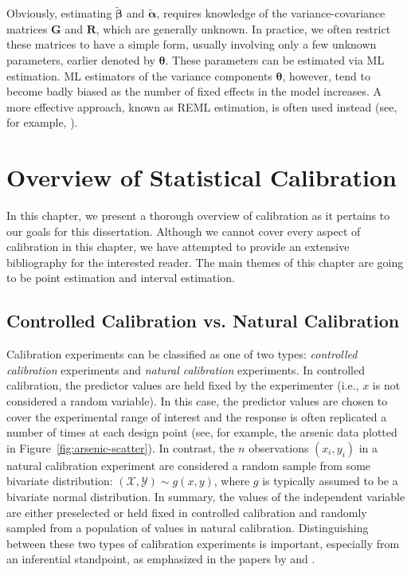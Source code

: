 \documentclass[cmfont,usenames,dvipsnames,leqno]{afit-etd}\usepackage[]{graphicx}\usepackage[]{color}
\newcommand{\mc}[1]{\ensuremath{\mathcal{#1}}}
\newcommand{\wt}[1]{\ensuremath{\widetilde{#1}}}
\begin{document}
Obviously, estimating $\wt{\bm{\beta}}$ and $\wt{\bm{\alpha}}$, requires knowledge of the variance-covariance matrices $\bm{G}$ and $\bm{R}$, which are generally unknown. In practice, we often restrict these matrices to have a simple form, usually involving only a few unknown parameters, earlier denoted by $\bm{\theta}$. These parameters can be estimated via \ac{ML} estimation. \ac{ML} estimators of the variance components $\bm{\theta}$, however, tend to become badly biased as the number of fixed effects in the model increases. A more effective approach, known as \ac{REML} estimation, is often used instead (see, for example, \citet[chap. 6]{mcculloch_generalized_2008}). 




\chapter{Overview of Statistical Calibration}
\label{chap:lit-review}
In this chapter, we present a thorough overview of calibration as it pertains to our goals for this dissertation. Although we cannot cover every aspect of calibration in this chapter, we have attempted to provide an extensive bibliography for the interested reader. The main themes of this chapter are going to be point estimation and interval estimation.

\section{Controlled Calibration vs. Natural Calibration}
\label{sec:controlled-vs-natural}
Calibration experiments can be classified as one of two types: \textit{controlled calibration} experiments and \textit{natural calibration} experiments. In controlled calibration, the predictor values are held fixed by the experimenter (i.e., $x$ is not considered a random variable). In this case, the predictor values are chosen to cover the experimental range of interest and the response is often replicated a number of times at each design point (see, for example, the arsenic data plotted in Figure~\ref{fig:arsenic-scatter}). In contrast, the $n$ observations $(x_i, y_i)$ in a natural calibration experiment are considered a random sample from some bivariate distribution: $(\mc{X}, \mc{Y}) \sim g(x, y)$, where $g$ is typically assumed to be a bivariate normal distribution. In summary, the values of the independent variable are either preselected or held fixed in controlled calibration and randomly sampled from a population of values in natural calibration. Distinguishing between these two types of calibration experiments is important, especially from an inferential standpoint, as emphasized in the papers by \citet{brown_multivariate_1982} and \citet{brown_measurement_1993}.
\end{document}
